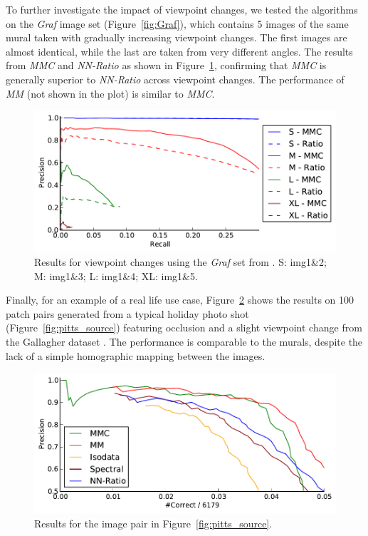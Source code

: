\documentclass[conference]{IEEEtran}
\begin{document}
To further investigate the impact of viewpoint changes, we tested the 
algorithms on the \emph{Graf} image set (Figure~\ref{fig:Graf}), which 
contains 5 images of the same mural taken with gradually increasing 
viewpoint changes.  The first images are almost identical, while the 
last are taken from very different angles. The results from   \emph{MMC} 
and \emph{NN-Ratio} as shown in Figure~\ref{fig:result_viewpoint}, 
confirming that \emph{MMC} is generally superior to \emph{NN-Ratio} 
across viewpoint changes.
The performance of \emph{MM} (not shown in the plot) is similar to 
\emph{MMC}.

\begin{figure}[htb]
	\centering
    \includegraphics[width=0.8\columnwidth]{images/result_viewpoint}
	\caption{Results for viewpoint changes using the \emph{Graf} set from 
		\cite{mikolajczyk2005performance}.  S: img1\&2; M: img1\&3; L: img1\&4; XL: img1\&5.}
	\label{fig:result_viewpoint}
\end{figure}

Finally, for an example of a real life use case, 
Figure~\ref{fig:result_pitts} shows the results on 100 patch pairs 
generated from a typical holiday photo shot 
(Figure~\ref{fig:pitts_source}) featuring occlusion and a slight 
viewpoint change from the Gallagher dataset \cite{gallagher2008}.  The 
performance is comparable to the murals, despite the lack of a simple 
homographic mapping between the images.

\begin{figure}[htb]
\centering
\includegraphics[width=0.8\columnwidth]{images/result_pitts}
\caption{Results for the image pair in Figure~\ref{fig:pitts_source}.}
\label{fig:result_pitts}
\end{figure}
\end{document}
